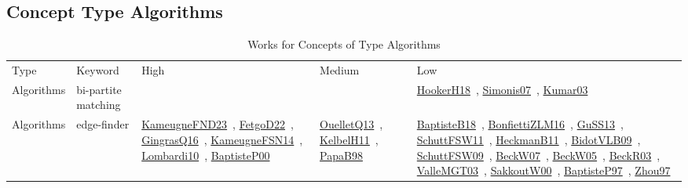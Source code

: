 \clearpage
\subsection{Concept Type Algorithms}
\label{sec:Algorithms}
{\scriptsize
\begin{longtable}{lp{3cm}>{\raggedright\arraybackslash}p{6cm}>{\raggedright\arraybackslash}p{6cm}>{\raggedright\arraybackslash}p{8cm}}
\rowcolor{white}\caption{Works for Concepts of Type Algorithms}\\ \toprule
\rowcolor{white}Type & Keyword & High & Medium & Low\\ \midrule\endhead
\bottomrule
\endfoot
Algorithms & bi-partite matching &  &  & \href{works/HookerH18.pdf}{HookerH18}~\cite{HookerH18}, \href{works/Simonis07.pdf}{Simonis07}~\cite{Simonis07}, \href{works/Kumar03.pdf}{Kumar03}~\cite{Kumar03}\\
Algorithms & edge-finder & \href{works/KameugneFND23.pdf}{KameugneFND23}~\cite{KameugneFND23}, \href{works/FetgoD22.pdf}{FetgoD22}~\cite{FetgoD22}, \href{works/GingrasQ16.pdf}{GingrasQ16}~\cite{GingrasQ16}, \href{works/KameugneFSN14.pdf}{KameugneFSN14}~\cite{KameugneFSN14}, \href{works/Lombardi10.pdf}{Lombardi10}~\cite{Lombardi10}, \href{works/BaptisteP00.pdf}{BaptisteP00}~\cite{BaptisteP00} & \href{works/OuelletQ13.pdf}{OuelletQ13}~\cite{OuelletQ13}, \href{works/KelbelH11.pdf}{KelbelH11}~\cite{KelbelH11}, \href{works/PapaB98.pdf}{PapaB98}~\cite{PapaB98} & \href{works/BaptisteB18.pdf}{BaptisteB18}~\cite{BaptisteB18}, \href{works/BonfiettiZLM16.pdf}{BonfiettiZLM16}~\cite{BonfiettiZLM16}, \href{works/GuSS13.pdf}{GuSS13}~\cite{GuSS13}, \href{works/SchuttFSW11.pdf}{SchuttFSW11}~\cite{SchuttFSW11}, \href{works/HeckmanB11.pdf}{HeckmanB11}~\cite{HeckmanB11}, \href{works/BidotVLB09.pdf}{BidotVLB09}~\cite{BidotVLB09}, \href{works/SchuttFSW09.pdf}{SchuttFSW09}~\cite{SchuttFSW09}, \href{works/BeckW07.pdf}{BeckW07}~\cite{BeckW07}, \href{works/BeckW05.pdf}{BeckW05}~\cite{BeckW05}, \href{works/BeckR03.pdf}{BeckR03}~\cite{BeckR03}, \href{works/ValleMGT03.pdf}{ValleMGT03}~\cite{ValleMGT03}, \href{works/SakkoutW00.pdf}{SakkoutW00}~\cite{SakkoutW00}, \href{works/BaptisteP97.pdf}{BaptisteP97}~\cite{BaptisteP97}, \href{works/Zhou97.pdf}{Zhou97}~\cite{Zhou97}\\

\end{longtable}}
